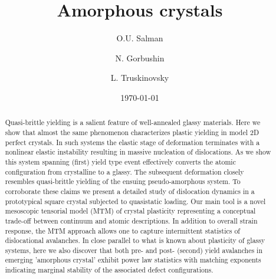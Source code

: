 \documentclass[aps,
superscriptaddress,notitlepage]{revtex4-1}
\begin{document}

\title{Amorphous crystals}
\author{O.U. Salman}
\author{N. Gorbushin}
\author{ L. Truskinovsky}

\date{\today}
\begin{abstract}
Quasi-brittle yielding is a salient feature  of well-annealed glassy materials. Here we show that almost the same phenomenon characterizes plastic yielding in  model 2D perfect crystals. 
In such systems the elastic stage of deformation terminates  with a nonlinear elastic instability resulting in massive nucleation of dislocations.  As we show this system spanning (first) yield type event  effectively converts the atomic configuration from  crystalline  to a glassy. The subsequent deformation closely resembles quasi-brittle yielding of the ensuing  pseudo-amorphous system. To corroborate these claims we present a detailed study of  dislocation dynamics  in  a    prototypical square crystal  subjected to quasistatic loading. Our main tool is a novel mesoscopic tensorial model  (MTM) of crystal plasticity representing a conceptual trade-off between continuum  and atomic descriptions. In addition to overall strain response,  the MTM approach allows one  to  capture  intermittent statistics of dislocational avalanches. In close parallel  to what is known about plasticity of glassy systems, here  we also discover that both pre- and post- (second) yield  avalanches in emerging 'amorphous crystal' exhibit power law statistics with  matching exponents indicating marginal stability of the associated defect configurations. 
\end{abstract}
\maketitle
\noindent
\end{document}
